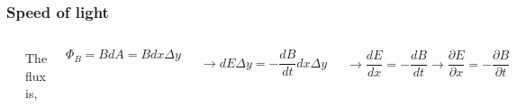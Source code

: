 \documentclass[]{beamer}
\begin{document}
\begin{frame}

\frametitle{Speed of light}



   \begin{columns}[c]
   \column{2in}  %
  
 \begin{center}
  \includegraphics[height=1.4in]{images5/EMwave2.jpg}
\end{center}


   \column{2.5in}
\pause

The flux is,

\begin{equation*}
\Phi_B=BdA=Bdx\Delta y
\end{equation*}

\pause

\begin{equation*}
\rightarrow dE\Delta y=-\frac{dB}{dt}dx\Delta y
\end{equation*}
\pause

\begin{equation}
\rightarrow \frac{dE}{dx}=-\frac{dB}{dt}\rightarrow  \frac{\partial E}{\partial x}=-\frac{\partial B}{\partial t}
\label{eq:1}
\end{equation}




   \end{columns}




  \end{frame}









\end{document}
